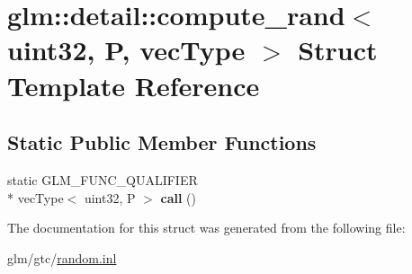 \hypertarget{structglm_1_1detail_1_1compute__rand_3_01uint32_00_01P_00_01vecType_01_4}{\section{glm\-:\-:detail\-:\-:compute\-\_\-rand$<$ uint32, P, vec\-Type $>$ Struct Template Reference}
\label{structglm_1_1detail_1_1compute__rand_3_01uint32_00_01P_00_01vecType_01_4}
}
\subsection*{Static Public Member Functions}
\begin{DoxyCompactItemize}
\item 
\hypertarget{structglm_1_1detail_1_1compute__rand_3_01uint32_00_01P_00_01vecType_01_4_a17aa209c7dbc4ffabd9373b4b8b99f8a}{static G\-L\-M\-\_\-\-F\-U\-N\-C\-\_\-\-Q\-U\-A\-L\-I\-F\-I\-E\-R \\*
vec\-Type$<$ uint32, P $>$ {\bfseries call} ()}\label{structglm_1_1detail_1_1compute__rand_3_01uint32_00_01P_00_01vecType_01_4_a17aa209c7dbc4ffabd9373b4b8b99f8a}

\end{DoxyCompactItemize}


The documentation for this struct was generated from the following file\-:\begin{DoxyCompactItemize}
\item 
glm/gtc/\hyperlink{random_8inl}{random.\-inl}\end{DoxyCompactItemize}
